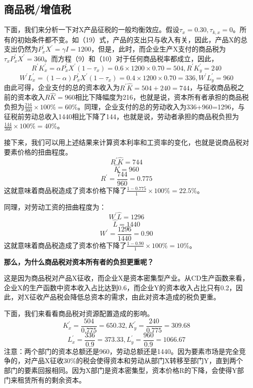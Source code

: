 \documentclass[cn,10pt,math=newtx,citestyle=gb7714-2015,bibstyle=gb7714-2015]{elegantbook}
\begin{document}
	\subsection{商品税/增值税}
	下面，我们来分析一下对X产品征税的一般均衡效应。假设$\tau_x=0.30,\tau_{k,x}=0$。所有的初始条件都不变。如（19）式，产品的支出只与收入有关，因此，产品X的总支出仍然为$P_x^{'}X^{'}=\gamma I=1200$，但是，此时，而企业生产X支付的商品税为$\tau_xP_x^{'}X^{'}=360$。而方程（9）和（10）对于任何商品税率都成立，因此，
	\begin{equation}
		R^{'}K_x^{'}=\alpha P_x^{'}X^{'}(1-\tau_x)=0.6\times 1200 \times 0.70=504,R^{'}K_y^{'}=240
	\end{equation}
	\begin{equation}
		W^{'}L_x^{'}=(1-\alpha) P_x^{'}X^{'}(1-\tau_x)=0.4\times 1200 \times 0.70=336,W^{'}L_y^{'}=960
	\end{equation}
	由此可得，企业支付的总的资本收入为$R^{'}\hat{K}=504+240=744$，与征收商品税之前的资本收入$R\hat{K}=960$相比下降幅度为216，也就是说，资本所有者承担的商品税负担为$\frac{216}{360}\times 100\%=60\%$。同理，企业支付的总的劳动收入为336+960=1296，与征税前劳动总收入1440相比下降了144，也就是说，劳动者承担的商品税负担为$\frac{144}{360}\times 100\%=40\%$。
	
	接下来，我们可以用上述结果来计算资本利率和工资率的变化，也就是说商品税对要素价格的扭曲程度。
	$$R^{'}\hat{K}=744$$
	$$\hat{K}=960$$
	$$R^{'}=\frac{744}{960}=0.775$$
	这就意味着商品税造成了资本价格下降了$\frac{1-0.775}{1}\times 100\%=22.5\%$。
	
	同理，对劳动工资的扭曲程度为：
	$$W^{'}\hat{L}=1296$$
	$$\hat{L}=1440$$
	$$W^{'}=\frac{1296}{1440}=0.90$$
	这就意味着商品税造成了资本价格下降了$\frac{1-0.90}{1}\times 100\%=10\%$。
	
	\textbf{那么，为什么商品税对资本所有者的负担更重呢？}
	
	这是因为商品税对产品X征收，而企业X是资本密集型产业。从CD生产函数来看，企业X的生产函数中资本收入占比达到0.6，而企业Y的资本收入占比只有0.2，因此，对X征收产品税会降低总资本的需求，由此对资本造成的税负更重。
	
	下面，我们来看看商品税对资源配置造成的影响。
	$$K_x^{'}=\frac{504}{0.775}=650.32,K_y^{'}=\frac{240}{0.775}=309.68$$
	$$L_x^{'}=\frac{336}{0.9}=373.33,L_y^{'}=\frac{960}{0.9}=1066.67$$
	注意：两个部门的资本总额还是960，劳动总额还是1440。因为要素市场是完全竞争的，对产品X征收30\%的税会使得资本和劳动从部门X转移至部门Y，直到两个部门的要素回报相同。因为X部门是资本密集型，资本价格R的下降，会使得Y部门来租赁所有的剩余资本。
	
\end{document}
